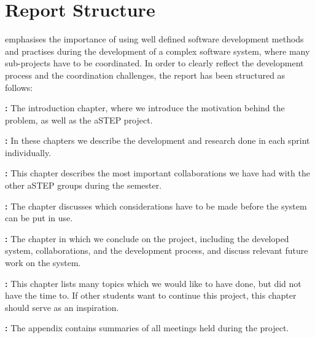 \section{Report Structure} \label{sec:report_structure}
 emphasises the importance of using well defined software development methods and practises during the development of a complex software system, where many sub-projects have to be coordinated. In order to clearly reflect the development process and the coordination challenges, the report has been structured as follows:

\textbf{:} The introduction chapter, where we introduce the motivation behind the problem, as well as the aSTEP project.

\textbf{:} In these chapters we describe the development and research done in each sprint individually.

\textbf{:} This chapter describes the most important collaborations we have had with the other aSTEP groups during the semester.

\textbf{:} The chapter discusses which considerations have to be made before the system can be put in use.

\textbf{:} The chapter in which we conclude on the project, including the developed system, collaborations, and the development process, and discuss relevant future work on the system.

\textbf{:} This chapter lists many topics which we would like to have done, but did not have the time to. If other students want to continue this project, this chapter should serve as an inspiration.

\textbf{:} The appendix contains summaries of all meetings held during the project.